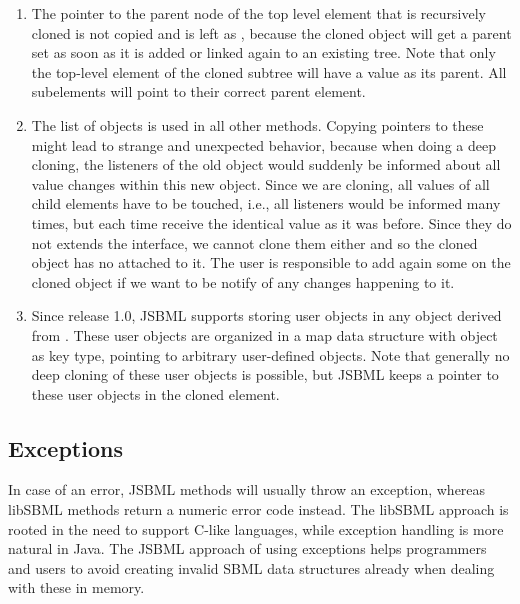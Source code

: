 \begin{enumerate}

\item The pointer to the parent node of the top level element that is
  recursively cloned is not copied and is left as , because the
  cloned object will get a parent set as soon as it is added or linked again
  to an existing tree. Note that only the top-level element of the cloned
  subtree will have a  value as its parent. All subelements will
  point to their correct parent element.

\item The list of \TreeNodeChangeListener objects is used in all other
   methods. Copying pointers to these might lead to strange and
  unexpected behavior, because when doing a deep cloning, the listeners of
  the old object would suddenly be informed about all value changes within
  this new object.  Since we are cloning, all values of all child elements
  have to be touched, i.e., all listeners would be informed many times, but
  each time receive the identical value as it was before. Since they do not
  extends the \Cloneable interface, we cannot clone them either and so the cloned
  object has no \TreeNodeChangeListener attached to it. The user is responsible
  to add again some \TreeNodeChangeListener on the cloned object if we want to be
  notify of any changes happening to it.

\item Since release 1.0, JSBML supports storing user objects in any object
  derived from \AbstractTreeNode.  These user objects are organized in a map
  data structure with object as key type, pointing to arbitrary user-defined
  objects. Note that generally no deep cloning of these user objects is
  possible, but JSBML keeps a pointer to these user objects in the cloned
  element.

\end{enumerate}


\subsection{Exceptions}
\label{sec:exceptions}

In case of an error, JSBML  methods will usually throw an
exception, whereas libSBML  methods return a
numeric error code instead. The libSBML approach is rooted in the need to
support C-like languages, while exception handling is more natural in Java.
The JSBML approach of using exceptions helps programmers and users to avoid
creating invalid SBML data structures already when dealing with these in
memory. 

